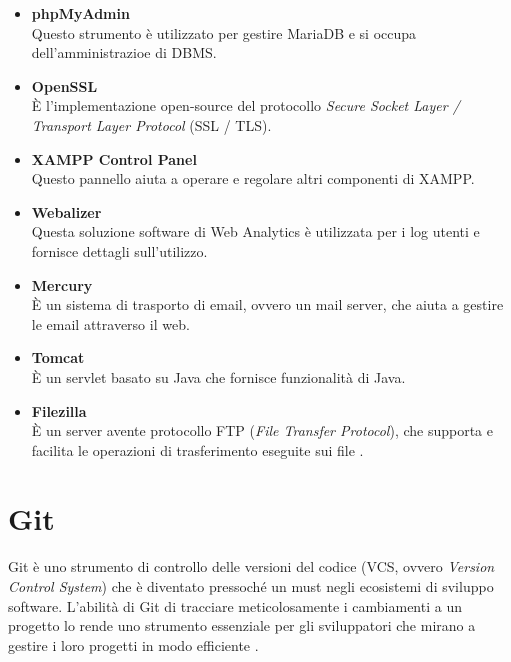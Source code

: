 \begin{itemize}
    \item \textbf{phpMyAdmin}\\
    Questo strumento è utilizzato per gestire MariaDB e si occupa dell'amministrazioe di DBMS.
    \item \textbf{OpenSSL}\\
    \`E l'implementazione open-source del protocollo \textit{Secure Socket Layer / Transport Layer Protocol} (SSL / TLS).
    \item \textbf{XAMPP Control Panel}\\
    Questo pannello aiuta a operare e regolare altri componenti di XAMPP.
    \item \textbf{Webalizer}\\
    Questa soluzione software di Web Analytics è utilizzata per i log utenti e fornisce dettagli sull'utilizzo.
    \item \textbf{Mercury}\\
    \`E un sistema di trasporto di email, ovvero un mail server, che aiuta a gestire le email attraverso il web.
    \item \textbf{Tomcat}\\
    \`E un servlet basato su Java che fornisce funzionalità di Java.
    \item \textbf{Filezilla}\\
    \`E un server avente protocollo FTP (\textit{File Transfer Protocol}), che supporta e facilita le operazioni di trasferimento eseguite sui file \cite{XAMPP}.
\end{itemize}


\section{Git}
Git è uno strumento di controllo delle versioni del codice (VCS, ovvero \textit{Version Control System}) che è diventato pressoché un must negli ecosistemi di sviluppo software. L'abilità di Git di tracciare meticolosamente i cambiamenti a un progetto lo rende uno strumento essenziale per gli sviluppatori che mirano a gestire i loro progetti in modo efficiente \cite{Git, Git_Docs}.

